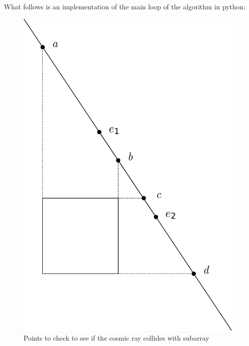 \documentclass[a4paper,12pt,final]{article}
\begin{document}
What follows is an implementation of the main loop of the algorithm in
python:
\pagebreak
\begin{figure}[hb]
\centering
    \includegraphics[height=1\textheight]{drawing2.pdf}
\caption{Points to check to see if the cosmic ray collides with subarray}\label{drawing2}
\end{figure}
\clearpage
\end{document}
